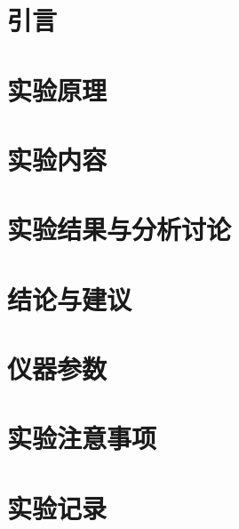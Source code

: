 \documentclass{wsrep}
\begin{document}
	
	\section{引言}
		
	\section{实验原理}
		
	\section{实验内容}
		
	\section{实验结果与分析讨论}
		
	\section{结论与建议}
		
	
	\begin{appendix}
		\section{仪器参数}
			\label{apd:apparatus}
		\section{实验注意事项}
			
		\section{实验记录}
			
	\end{appendix}
\end{document}
